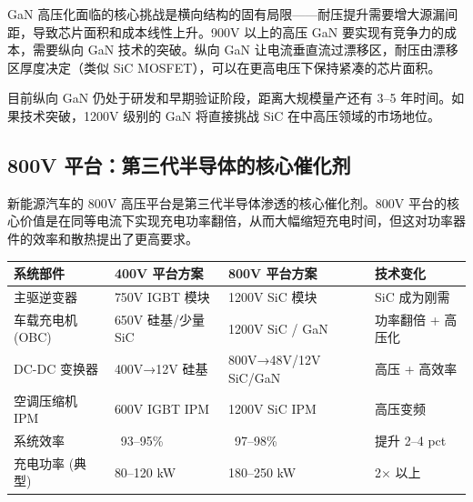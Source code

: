 \begin{exhibitbox}
\vspace{0.2cm}
\end{exhibitbox}

GaN 高压化面临的核心挑战是横向结构的固有局限——耐压提升需要增大源漏间距，导致芯片面积和成本线性上升。900V 以上的高压 GaN 要实现有竞争力的成本，需要纵向 GaN 技术的突破。纵向 GaN 让电流垂直流过漂移区，耐压由漂移区厚度决定（类似 SiC MOSFET），可以在更高电压下保持紧凑的芯片面积。

目前纵向 GaN 仍处于研发和早期验证阶段，距离大规模量产还有 3–5 年时间。如果技术突破，1200V 级别的 GaN 将直接挑战 SiC 在中高压领域的市场地位。

\subsection{800V 平台：第三代半导体的核心催化剂}

新能源汽车的 800V 高压平台是第三代半导体渗透的核心催化剂。800V 平台的核心价值是在同等电流下实现充电功率翻倍，从而大幅缩短充电时间，但这对功率器件的效率和散热提出了更高要求。

\begin{exhibitbox}[表 4-9：400V 与 800V 平台器件需求对比]
\centering
\small
\setlength{\tabcolsep}{4pt}
\begin{tabularx}{\textwidth}{L{3.2cm} C{3.2cm} C{3.2cm} C{3.2cm}}
\toprule
\textbf{系统部件} & \textbf{400V 平台方案} & \textbf{800V 平台方案} & \textbf{技术变化} \\
\midrule
主驱逆变器 & 750V IGBT 模块 & 1200V SiC 模块 & SiC 成为刚需 \\
车载充电机 (OBC) & 650V 硅基/少量 SiC & 1200V SiC / GaN & 功率翻倍 + 高压化 \\
DC-DC 变换器 & 400V→12V 硅基 & 800V→48V/12V SiC/GaN & 高压 + 高效率 \\
空调压缩机 IPM & 600V IGBT IPM & 1200V SiC IPM & 高压变频 \\
\midrule
{}
系统效率 & ~93–95\% & ~97–98\% & 提升 2–4 pct \\
充电功率 (典型) & 80–120 kW & 180–250 kW & 2× 以上 \\
\bottomrule
\end{tabularx}
\end{exhibitbox}

